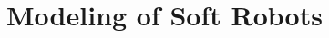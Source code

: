 \documentclass[print,thumbmain]{thesis}  %
\author{Brandon Jonathan Caasenbrood}
\begin{document}
\thispagestyle{empty}


%

%
%

\cleardoublepage
{}
\tableofcontents
\newpage


\isstarredchapterfalse
\cleardoublepage
\thispagestyle{empty}
\label{chap: intro}
\setcounter{page}{1}
%
\cleardoublepage
%

\part{Modeling of Soft Robots}\label{part: model}

\end{document}
